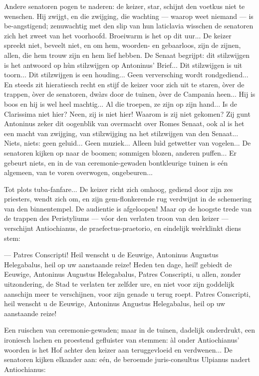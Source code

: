 \documentclass[a4paper, 12pt, oneside, dutch]{article}
\begin{document}
Andere senatoren pogen te naderen: de keizer, star, schijnt den voetkus niet te wenschen. Hij zwijgt, en die zwijging, die wachting --- waarop weet niemand --- is be-angstigend; zenuwachtig met den slip van hun laticlavia wisschen de senatoren zich het zweet van het voorhoofd. Broeiwarm is het op dit uur... De keizer spreekt niet, beveelt niet, en om hem, woorden- en gebaarloos, zijn de zijnen, allen, die hem trouw zijn en hem lief hebben. De Senaat begrijpt: dit stilzwijgen is het antwoord op hùn stilzwijgen op Antoninus' Brief... Dit stilzwijgen is uit toorn... Dit stilzwijgen is een houding... Geen verversching wordt rondgediend... En steeds zit hieratiesch recht en stijf de keizer voor zich uit te staren, òver de trappen, òver de senatoren, dwàrs door de tuinen, òver de Campania heen... Hij is boos en hij is wel heel machtig... Al die troepen, ze zijn op zijn hand... Is de Clarissima niet hier? Neen, zij is niet hier! Waarom is zij niet gekomen? Zij gunt Antoninus zeker dit oogenblik van overmacht over Romes Senaat, ook al is het een macht van zwijging, van stilzwijging na het stilzwijgen van den Senaat... Niets, niets: geen geluid... Geen muziek... Alleen luìd getwetter van vogelen... De senatoren kijken op naar de boomen; sommigen blozen, anderen puffen... Er gebeurt niets, en in de van ceremonie-gewaden bontkleurige tuinen is eén algemeen, van te voren overwogen, ongebeuren...

Tot plots tuba-fanfare... De keizer richt zich omhoog, gediend door zijn zes priesters, wendt zich om, en zijn gem-flonkerende rug verdwijnt in de schemering van den binnentempel. De audientie is afgeloopen! Maar op de hoogste trede van de trappen des Peristyliums --- vóor den verlaten troon van den keizer --- verschijnt Antiochianus, de praefectus-praetorio, en eindelijk weêrklinkt diens stem:

--- Patres Conscripti! Heil wenscht u de Eeuwige, Antoninus Augustus Helegabalus, heil op uw aanstaande reize! Heden ten dage, heil! gebiedt de Eeuwige, Antoninus Augustus Helegabalus, Patres Conscripti, u allen, zonder uitzondering, de Stad te verlaten ter zelfder ure, en niet voor zijn goddelijk aanschijn meer te verschijnen, voor zijn genade u terug roept. Patres Conscripti, heil wenscht u de Eeuwige, Antoninus Angustus Helegabalus, heil op uw aanstaande reize!

Een ruischen van ceremonie-gewaden; maar in de tuinen, dadelijk onderdrukt, een ironiesch lachen en proestend gefluister van stemmen: àl onder Antiochianus' woorden is het Hof achter den keizer aan teruggevloeid en verdwenen... De senatoren kijken elkander aan: eén, de beroemde juris-consultus Ulpianus nadert Antiochianus:
\end{document}
